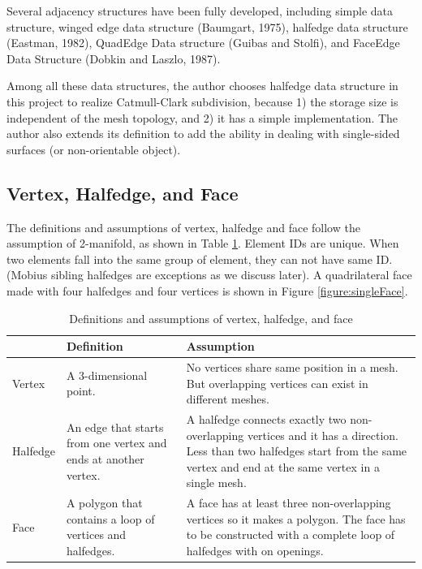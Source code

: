 \documentclass[12pt]{article}
\begin{document}
Several adjacency structures have been fully developed, including simple data structure, winged edge data structure (Baumgart, 1975), halfedge data structure (Eastman, 1982), QuadEdge Data structure (Guibas and Stolfi), and FaceEdge Data Structure (Dobkin and Laszlo, 1987).

Among all these data structures, the author chooses halfedge data structure in this project to realize Catmull-Clark subdivision, because 1) the storage size is independent of the mesh topology, and 2) it has a simple implementation. The author also extends its definition to add the ability in dealing with single-sided surfaces (or non-orientable object).

\subsection{Vertex, Halfedge, and Face}

The definitions and assumptions of vertex, halfedge and face follow the assumption of 2-manifold, as shown in Table \ref{table:vhfdef}. Element IDs are unique. When two elements fall into the same group of element, they can not have same ID. (Mobius sibling halfedges are exceptions as we discuss later). A quadrilateral face made with four halfedges and four vertices is shown in Figure \ref{figure:singleFace}.

\begin{table}[h]
\centering
\begin{tabular}{| l | p{} | p{}|}

\hline
    & Definition  & Assumption  \\
\hline
Vertex  & A 3-dimensional point.    & No vertices share same position in a mesh. But overlapping vertices can exist in different meshes.\\
\hline
Halfedge  & An edge that starts from one vertex and ends at another vertex. & A halfedge connects exactly two non-overlapping vertices and it has a direction. 
Less than two halfedges start from the same vertex and end at the same vertex in a single mesh.\\
\hline
Face    & A polygon that contains a loop of vertices and halfedges. & A face has at least three non-overlapping vertices so it makes a polygon. The face has to be constructed with a complete loop of halfedges with on openings.\\
\hline
\end{tabular}
\caption{Definitions and assumptions of vertex, halfedge, and face} 
\label{table:vhfdef}
\end{table}
\end{document}
